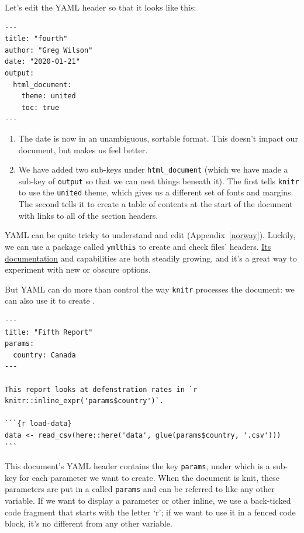 Let's edit the YAML header so that it looks like this:

\begin{lstlisting}
---
title: "fourth"
author: "Greg Wilson"
date: "2020-01-21"
output:
  html_document:
    theme: united
    toc: true
---
\end{lstlisting}

\begin{enumerate}
\item
  The date is now in an unambiguous, sortable format.
  This doesn't impact our document,
  but makes us feel better.
\item
  We have added two sub-keys under \texttt{html\_document}
  (which we have made a sub-key of \texttt{output} so that we can nest things beneath it).
  The first tells \texttt{knitr} to use the \texttt{united} theme,
  which gives us a different set of fonts and margins.
  The second tells it to create a table of contents at the start of the document
  with links to all of the section headers.
\end{enumerate}

YAML can be quite tricky to understand and edit (Appendix~\ref{norway}).
Luckily,
we can use a package called \texttt{ymlthis} to create and check files' headers.
\href{https://ymlthis.r-lib.org/}{Its documentation} and capabilities are both steadily growing,
and it's a great way to experiment with new or obscure options.

But YAML can do more than control the way \texttt{knitr} processes the document:
we can also use it to create .

\begin{lstlisting}
---
title: "Fifth Report"
params:
  country: Canada
---

This report looks at defenstration rates in `r knitr::inline_expr('params$country')`.

```{r load-data}
data <- read_csv(here::here('data', glue(params$country, '.csv')))
```
\end{lstlisting}

This document's YAML header contains the key \texttt{params},
under which is a sub-key for each parameter we want to create.
When the document is knit,
these parameters are put in a  called \texttt{params}
and can be referred to like any other variable.
If we want to display a parameter or other inline,
we use a back-ticked code fragment that starts with the letter `r';
if we want to use it in a fenced code block,
it's no different from any other variable.

